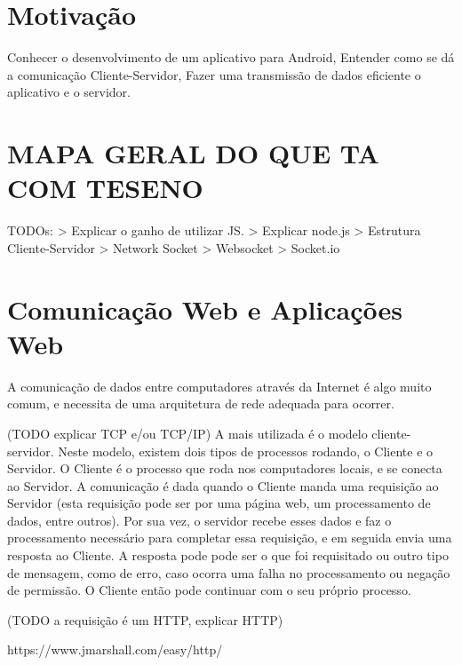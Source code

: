 \documentclass[a4paper,12pt]{article}
\begin{document}
\section{Motivação}

Conhecer o desenvolvimento de um aplicativo para Android,
Entender como se dá a comunicação Cliente-Servidor,
Fazer uma transmissão de dados eficiente o aplicativo e o servidor.





\section{MAPA GERAL DO QUE TA COM TESENO}

TODOs:
> Explicar o ganho de utilizar JS.
  > Explicar node.js
> Estrutura Cliente-Servidor
  > Network Socket > Websocket > Socket.io





\section{Comunicação Web e Aplicações Web}

A comunicação de dados entre computadores através da Internet é algo muito comum, e necessita de uma arquitetura de rede adequada para ocorrer.

(TODO explicar TCP e/ou TCP/IP)
A mais utilizada é o modelo cliente-servidor. Neste modelo, existem dois tipos de processos rodando, o Cliente e o Servidor. O Cliente é o processo que roda nos computadores locais, e se conecta ao Servidor. A comunicação é dada quando o Cliente manda uma requisição ao Servidor (esta requisição pode ser por uma página web, um processamento de dados, entre outros). Por sua vez, o servidor recebe esses dados e faz o processamento necessário para completar essa requisição, e em seguida envia uma resposta ao Cliente. A resposta pode pode ser o que foi requisitado ou outro tipo de mensagem, como de erro, caso ocorra uma falha no processamento ou negação de permissão. O Cliente então pode continuar com o seu próprio processo.


(TODO a requisição é um HTTP, explicar HTTP)

https://www.jmarshall.com/easy/http/
\end{document}
